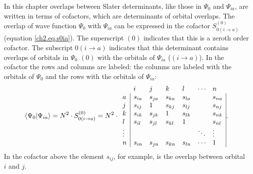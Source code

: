 In this chapter overlaps between Slater determinants, like those in $\Psi_0$ and $\Psi_{ia}$, are written in terms of cofactors, which are determinants of orbital overlaps. The overlap of wave function $\Psi_0$ with $\Psi_{ia}$ can be expressed in the cofactor $S_{0(i\rightarrow a)}^{(0)}$ (equation \ref{ch2.eq.s0ia}). The superscript $(0)$ indicates that this is a zeroth order cofactor. The subscript $0(i\rightarrow a)$ indicates that this determinant contains overlaps of orbitals in $\Psi_0$ $(0)$ with the orbitals of $\Psi_{ia}$ ($(i\rightarrow a)$). In the cofactor the rows and columns are labeled: the columns are labeled with the orbitals of $\Psi_0$ and the rows with the orbitals of $\Psi_{ia}$: 
\begin{equation}
\left < \Psi_0 | \Psi_{ia} \right> = N^2 \cdot S_{0(i\rightarrow a)}^{(0)} = N^2 \cdot
\begin{array}{lllllll}
 &  i & j & k & l & \cdots & n \\
 a &  \multicolumn{1}{|l}{ s_{ia} } & s_{ja} & s_{ka} & s_{la} & & \multicolumn{1}{l|}{ s_{na} } \\
 j & \multicolumn{1}{|l}{ s_{ij} } & 1 & s_{kj} & s_{lj} & & \multicolumn{1}{l|}{s_{nj}} \\
 k & \multicolumn{1}{|l}{ s_{ik} } & s_{jk} & 1 & s_{lk} & & \multicolumn{1}{l|}{s_{nk}} \\
 l & \multicolumn{1}{|l}{ s_{il} } & s_{jl} & s_{kl} & 1 & & \multicolumn{1}{l|}{s_{nl}} \\
 \vdots & \multicolumn{1}{|l}{ } &   &   & & \ddots & \multicolumn{1}{l|}{\vdots} \\
 n & \multicolumn{1}{|l}{ s_{in} } & s_{jn} & s_{kn} & s_{ln} & \cdots & \multicolumn{1}{l|}{1}
\end{array}.
\label{ch2.eq.s0ia}
\end{equation}
In the cofactor above the element $s_{ij}$, for example, is the overlap between orbital $i$ and $j$.

